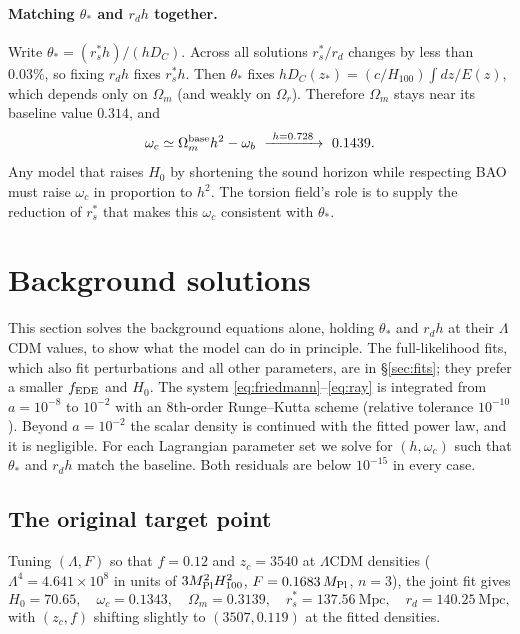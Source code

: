 \documentclass[11pt]{article}
\newcommand{\Mp}{M_{\rm Pl}}
\begin{document}
\paragraph{Matching $\theta_*$ and $r_dh$ together.} Write
$\theta_*=(r_s^*h)/(hD_C)$. Across all solutions $r_s^*/r_d$ changes by less than
$0.03\%$, so fixing $r_dh$ fixes $r_s^*h$. Then $\theta_*$ fixes
$hD_C(z_*)=(c/H_{100})\int dz/E(z)$, which depends only on $\Omega_m$ (and weakly on
$\Omega_r$). Therefore $\Omega_m$ stays near its baseline value $0.314$, and
\begin{equation}
\omega_c\simeq\Omega_m^{\rm base}h^2-\omega_b
\ \xrightarrow{\ h=0.728\ }\ 0.1439 .
\label{eq:wc}
\end{equation}
Any model that raises $H_0$ by shortening the sound horizon while respecting BAO must
raise $\omega_c$ in proportion to $h^2$. The torsion field's role is to supply the
reduction of $r_s^*$ that makes this $\omega_c$ consistent with $\theta_*$.

\section{Background solutions}\label{sec:results}
This section solves the background equations alone, holding $\theta_*$ and $r_dh$ at their
$\Lambda$CDM values, to show what the model can do in principle. The full-likelihood fits,
which also fit perturbations and all other parameters, are in \S\ref{sec:fits}; they prefer
a smaller $f_{\rm EDE}$ and $H_0$. The system \eqref{eq:friedmann}--\eqref{eq:ray} is integrated from $a=10^{-8}$ to
$10^{-2}$ with an 8th-order Runge--Kutta scheme (relative tolerance $10^{-10}$). Beyond
$a=10^{-2}$ the scalar density is continued with the fitted power law, and it is
negligible. For each Lagrangian parameter set we solve for $(h,\omega_c)$ such that
$\theta_*$ and $r_dh$ match the baseline. Both residuals are below $10^{-15}$ in every
case.

\subsection{The original target point}
Tuning $(\Lambda,F)$ so that $f=0.12$ and $z_c=3540$ at $\Lambda$CDM densities
($\Lambda^4=4.641\times10^8$ in units of $3\Mp^2H_{100}^2$, $F=0.1683\,\Mp$, $n=3$), the
joint fit gives
\begin{equation}
H_0=70.65,\quad \omega_c=0.1343,\quad \Omega_m=0.3139,\quad
r_s^*=137.56\ \mathrm{Mpc},\quad r_d=140.25\ \mathrm{Mpc},
\end{equation}
with $(z_c,f)$ shifting slightly to $(3507,0.119)$ at the fitted densities.
\end{document}
